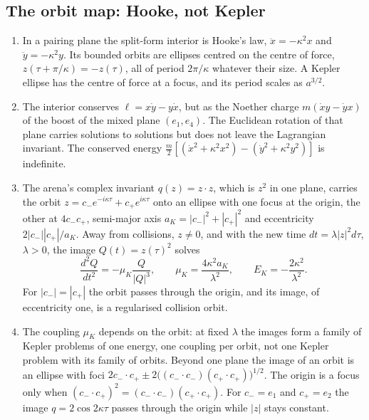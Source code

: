 \subsection{The orbit map: Hooke, not Kepler}
\label{sec:orbital:hooke}

\begin{proposition}
\label{prop:hooke}
\begin{enumerate}[label=(\roman*),leftmargin=2.2em]
\item In a pairing plane the split-form interior is Hooke's law, $\ddot x=-\kappa^2x$ and $\ddot y=-\kappa^2y$. Its bounded orbits are ellipses
centred on the centre of force, $z(\tau+\pi/\kappa)=-z(\tau)$, all of period $2\pi/\kappa$ whatever their size. A Kepler ellipse has the centre of
force at a focus, and its period scales as $a^{3/2}$.
\item The interior conserves $\ell=x\dot y-y\dot x$, but as the Noether charge $m(\dot xy-\dot yx)$ of the boost of the mixed plane
$(e_1,e_4)$. The Euclidean rotation of that plane carries solutions to solutions but does not leave the Lagrangian invariant. The conserved
energy $\tfrac m2[(\dot x^2+\kappa^2x^2)-(\dot y^2+\kappa^2y^2)]$ is indefinite.
\item The arena's complex invariant $q(z)=z\cdot z$, which is $z^2$ in one plane, carries the orbit $z=c_-e^{-i\kappa\tau}+c_+e^{i\kappa\tau}$ onto an
ellipse with one focus at the origin, the other at $4c_-c_+$, semi-major axis $a_K=|c_-|^2+|c_+|^2$ and eccentricity $2|c_-||c_+|/a_K$. Away from
collisions, $z\neq0$, and with the new time $dt=\lambda|z|^2d\tau$, $\lambda>0$, the image $Q(t)=z(\tau)^2$ solves
\[
\frac{d^2Q}{dt^2}=-\mu_K\frac{Q}{|Q|^3},\qquad \mu_K=\frac{4\kappa^2a_K}{\lambda^2},\qquad E_K=-\frac{2\kappa^2}{\lambda^2} .
\]
For $|c_-|=|c_+|$ the orbit passes through the origin, and its image, of eccentricity one, is a regularised collision orbit.
\item The coupling $\mu_K$ depends on the orbit: at fixed $\lambda$ the images form a family of Kepler problems of one energy, one coupling per
orbit, not one Kepler problem with its family of orbits. Beyond one plane the image of an orbit is an ellipse with foci
$2c_-\cdot c_+\pm2\bigl((c_-\cdot c_-)(c_+\cdot c_+)\bigr)^{1/2}$. The origin is a focus only when $(c_-\cdot c_+)^2=(c_-\cdot c_-)(c_+\cdot c_+)$. For
$c_-=e_1$ and $c_+=e_2$ the image $q=2\cos2\kappa\tau$ passes through the origin while $|z|$ stays constant.
\end{enumerate}
\end{proposition}

